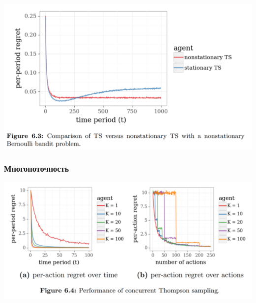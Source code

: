 \documentclass[fullscreen=true, bookmarks=true, hyperref={pdfencoding=unicode}]{beamer}
\begin{document}
\begin{frame}
  \begin{center}
    \includegraphics[keepaspectratio,
                     width=.9\paperwidth]{nonstationary_TS.png}
  \end{center}
\end{frame}


\begin{frame}
  \frametitle{Многопоточность}

  \begin{center}
    \includegraphics[keepaspectratio,
                     width=.9\paperwidth]{concurrent.png}
  \end{center}
\end{frame}
\end{document}
